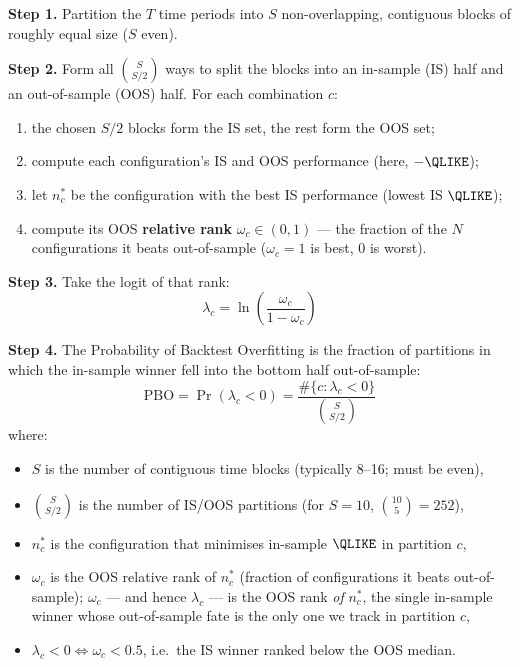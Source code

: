 \begin{definition}
\textbf{Step 1.} Partition the $T$ time periods into $S$ non-overlapping, contiguous blocks of roughly equal size ($S$ even).

\textbf{Step 2.} Form all $\binom{S}{S/2}$ ways to split the blocks into an in-sample (IS) half and an out-of-sample (OOS) half. For each combination $c$:
\begin{enumerate}[nosep]
  \item the chosen $S/2$ blocks form the IS set, the rest form the OOS set;
  \item compute each configuration's IS and OOS performance (here, $-\QLIKE$);
  \item let $n^*_c$ be the configuration with the best IS performance (lowest IS $\QLIKE$);
  \item compute its OOS \textbf{relative rank} $\omega_c \in (0,1)$ --- the fraction of the $N$ configurations it beats out-of-sample ($\omega_c = 1$ is best, $0$ is worst).
\end{enumerate}

\textbf{Step 3.} Take the logit of that rank:
\begin{equation}
\label{eq:ch16-pbo-logit}
\lambda_c = \ln\!\left(\frac{\omega_c}{1 - \omega_c}\right)
\end{equation}

\textbf{Step 4.} The Probability of Backtest Overfitting is the fraction of partitions in which the in-sample winner fell into the bottom half out-of-sample:
\begin{equation}
\label{eq:ch16-pbo}
\text{PBO} = \Pr(\lambda_c < 0) = \frac{\#\{c : \lambda_c < 0\}}{\binom{S}{S/2}}
\end{equation}
where:
\begin{itemize}[nosep]
  \item $S$ is the number of contiguous time blocks (typically 8--16; must be even),
  \item $\binom{S}{S/2}$ is the number of IS/OOS partitions (for $S=10$, $\binom{10}{5}=252$),
  \item $n^*_c$ is the configuration that minimises in-sample $\QLIKE$ in partition $c$,
  \item $\omega_c$ is the OOS relative rank of $n^*_c$ (fraction of configurations it beats out-of-sample); $\omega_c$ --- and hence $\lambda_c$ --- is the OOS rank \emph{of} $n^*_c$, the single in-sample winner whose out-of-sample fate is the only one we track in partition $c$,
  \item $\lambda_c < 0 \iff \omega_c < 0.5$, i.e.\ the IS winner ranked below the OOS median.
\end{itemize}
\end{definition}

